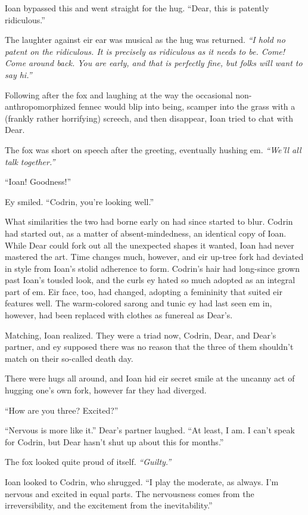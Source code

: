 Ioan bypassed this and went straight for the hug. ``Dear, this is patently ridiculous.''

The laughter against eir ear was musical as the hug was returned. \emph{``I hold no patent on the ridiculous. It is precisely as ridiculous as it needs to be. Come! Come around back. You are early, and that is perfectly fine, but folks will want to say hi.''}

Following after the fox and laughing at the way the occasional non-anthropomorphized fennec would blip into being, scamper into the grass with a (frankly rather horrifying) screech, and then disappear, Ioan tried to chat with Dear.

The fox was short on speech after the greeting, eventually hushing em. \emph{``We'll all talk together.''}

``Ioan! Goodness!''

Ey smiled. ``Codrin, you're looking well.''

What similarities the two had borne early on had since started to blur. Codrin had started out, as a matter of absent-mindedness, an identical copy of Ioan. While Dear could fork out all the unexpected shapes it wanted, Ioan had never mastered the art. Time changes much, however, and eir up-tree fork had deviated in style from Ioan's stolid adherence to form. Codrin's hair had long-since grown past Ioan's tousled look, and the curls ey hated so much adopted as an integral part of em. Eir face, too, had changed, adopting a femininity that suited eir features well. The warm-colored sarong and tunic ey had last seen em in, however, had been replaced with clothes as funereal as Dear's.

Matching, Ioan realized. They were a triad now, Codrin, Dear, and Dear's partner, and ey supposed there was no reason that the three of them shouldn't match on their so-called death day.

There were hugs all around, and Ioan hid eir secret smile at the uncanny act of hugging one's own fork, however far they had diverged.

``How are you three? Excited?''

``Nervous is more like it.'' Dear's partner laughed. ``At least, I am. I can't speak for Codrin, but Dear hasn't shut up about this for months.''

The fox looked quite proud of itself. \emph{``Guilty.''}

Ioan looked to Codrin, who shrugged. ``I play the moderate, as always. I'm nervous and excited in equal parts. The nervousness comes from the irreversibility, and the excitement from the inevitability.''

